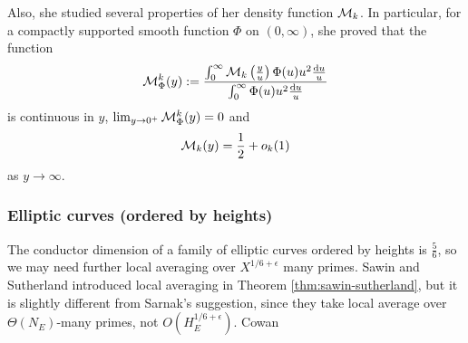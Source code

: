 Also, she studied several properties of her density function $\mathcal{M}_k$.
In particular, for a compactly supported smooth function $\Phi$ on $(0, \infty)$, she proved that the function
\begin{equation}
    \mathcal{M}_{\Phi}^k(y) := \frac{\int_0^\infty \mathcal{M}_k\left(\frac{y}{u}\right) \Phi(u) u^2 \frac{\mathrm{d} u}{u}}{\int_0^\infty \Phi(u) u^2 \frac{\mathrm{d} u}{u}}
\end{equation}
is continuous in $y$, $\lim_{y \to 0^+} \mathcal{M}_{\Phi}^k(y) = 0$ and
\[
\mathcal{M}_k(y) = \frac{1}{2} + o_k(1)
\]
as $y \to \infty$.

\subsubsection{Elliptic curves (ordered by heights)}

The conductor dimension of a family of elliptic curves ordered by heights is $\frac{5}{6}$, so we may need further local averaging over $X^{1/6 + \epsilon}$ many primes.
Sawin and Sutherland introduced local averaging in Theorem \ref{thm:sawin-sutherland}, but it is slightly different from Sarnak's suggestion, since they take local average over $\Theta(N_E)$-many primes, not $O(H_E^{1/6 + \epsilon})$.
\ber Cowan \cite{cowan2024murmurations}\er